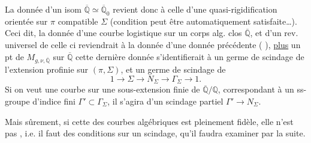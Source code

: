 La donnée d'un isom $\overline{\mathbb Q}\simeq\overline{\mathbb Q}_0$ revient donc à celle d'une quasi-rigidification orientée sur $\pi$ compatible  $\Sigma$ (condition peut être automatiquement satisfaite\ldots).
Ceci dit, la donnée d'une courbe logistique  sur   un corps alg. clos $\overline{\mathbb Q}$, et d'un rev. universel  de celle ci reviendrait à la donnée d'une donnée précédente ( ), \uline{plus} un pt de $M_{g,\nu,\overline{\mathbb Q}}$ sur $\overline{\mathbb Q}$   cette dernière donnée s'identifierait à un  germe de scindage de l'extension
profinie     sur $(\pi,\Sigma)$, et un germe de scindage de
\[
1\longrightarrow\Sigma\longrightarrow N_\Sigma\longrightarrow\Gamma_\Sigma\longrightarrow1.
\]
Si on veut une courbe sur une sous-extension finie  de $\overline{\mathbb Q}/\mathbb Q$, correspondant à un ss-groupe d'indice fini $\Gamma'\subset\Gamma_\Sigma$, il s'agira d'un scindage  partiel $\Gamma'\longrightarrow N_\Sigma$.


Mais sûrement, si cette   des courbes algébriques  est pleinement fidèle, elle n'est pas , i.e. il faut des conditions sur un scindage, qu'il faudra examiner par la suite.

